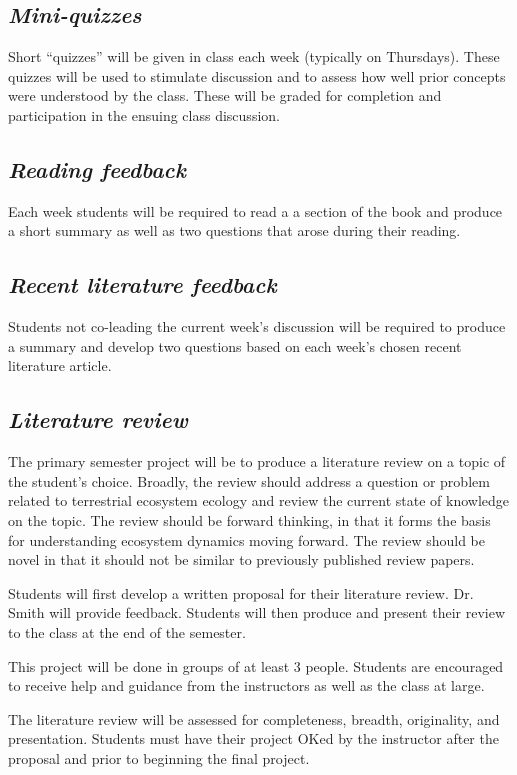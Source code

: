 \documentclass[12pt, notitlepage]{article}   	%
\begin{document}
{\subsection{\textit{Mini-quizzes}}
Short “quizzes” will be given in class each week (typically on Thursdays). 
These quizzes will be used to stimulate discussion and to assess how well 
prior concepts were understood by the class. 
These will be graded for completion and participation in the ensuing class discussion.

\subsection{\textit{Reading feedback}}
Each week students will be required to read a a section of the book 
and produce a short summary as well as two questions that arose during their 
reading. 

\subsection{\textit{Recent literature feedback}}
Students not co-leading the current week’s 
discussion will be required to produce a summary and 
develop two questions based on each week’s chosen recent literature article.

\subsection{\textit{Literature review}}
The primary semester project will be to produce a literature review on a topic 
of the student's choice.
Broadly, the review should address a question or problem related 
to terrestrial ecosystem ecology and review the current state of knowledge on the topic.
The review should be forward thinking, in that it forms the
basis for understanding ecosystem dynamics moving forward.
The review should be novel in that it should not be similar to previously published
review papers.

Students will first develop a written proposal for their literature review. Dr. Smith will provide feedback. 
Students will then produce and present 
their review to the class at the end of the semester. 

This project will be done in groups of at least 3 people. Students are encouraged to receive help and guidance 
from the instructors as well as the class at large. 

The literature review will be assessed for completeness, breadth, originality, and presentation.
Students must have their project OKed by the instructor after the proposal and prior to
beginning the final project.

}
\end{document}
